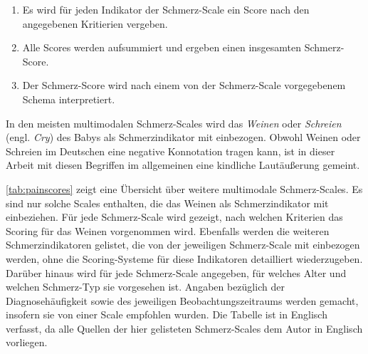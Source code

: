 \begin{enumerate}
\item Es wird für jeden Indikator der Schmerz-Scale ein Score nach den angegebenen Kritierien vergeben.
\item Alle Scores werden aufsummiert und ergeben einen insgesamten Schmerz-Score.
\item Der Schmerz-Score wird nach einem von der Schmerz-Scale vorgegebenem Schema interpretiert.\cite{aboutKids}\cite{pat}
\end{enumerate}

In den meisten multimodalen Schmerz-Scales wird das \emph{Weinen} oder \emph{Schreien} (engl. \emph{Cry}) des Babys als Schmerzindikator mit einbezogen.\cite[S. 97 - 98]{painInNeonates} Obwohl Weinen oder Schreien im Deutschen eine negative Konnotation tragen kann, ist in dieser Arbeit mit diesen Begriffen im allgemeinen eine \glqq kindliche Lautäußerung\grqq{} gemeint. 

\autoref{tab:painscores} zeigt eine Übersicht über weitere multimodale Schmerz-Scales. Es sind nur solche Scales enthalten, die das Weinen als Schmerzindikator mit einbeziehen. Für jede Schmerz-Scale wird gezeigt, nach welchen Kriterien das Scoring für das Weinen vorgenommen wird. Ebenfalls werden die weiteren Schmerzindikatoren gelistet, die von der jeweiligen Schmerz-Scale mit einbezogen werden, ohne die Scoring-Systeme für diese Indikatoren detailliert wiederzugeben. Darüber hinaus wird für jede Schmerz-Scale angegeben, für welches Alter und welchen Schmerz-Typ sie vorgesehen ist. Angaben bezüglich der Diagnosehäufigkeit sowie des jeweiligen Beobachtungszeitraums werden gemacht, insofern sie von einer Scale empfohlen wurden. Die Tabelle ist in Englisch verfasst, da alle Quellen der hier gelisteten Schmerz-Scales dem Autor in Englisch vorliegen.

